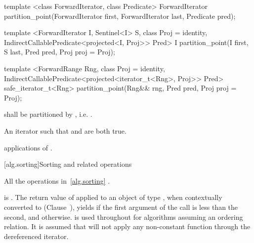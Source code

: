 %
\begin{removedblock}
\begin{itemdecl}
template <class ForwardIterator, class Predicate>
  ForwardIterator partition_point(ForwardIterator first,
                                  ForwardIterator last,
                                  Predicate pred);
\end{itemdecl}
\end{removedblock}
\begin{addedblock}
\begin{itemdecl}
template <ForwardIterator I, Sentinel<I> S, class Proj = identity,
    IndirectCallablePredicate<projected<I, Proj>> Pred>
  I partition_point(I first, S last, Pred pred, Proj proj = Proj{});

template <ForwardRange Rng, class Proj = identity,
    IndirectCallablePredicate<projected<iterator_t<Rng>, Proj>> Pred>
  safe_iterator_t<Rng>
    partition_point(Rng&& rng, Pred pred, Proj proj = Proj{});
\end{itemdecl}
\end{addedblock}

\begin{itemdescr}
\pnum
\requires {} shall be partitioned by , i.e.
.

\pnum
\returns An iterator  such that  and
 are both true.

\pnum
\complexity {} applications of .
\end{itemdescr}


[alg.sorting]{Sorting and related operations}

\pnum
All the operations in~\ref{alg.sorting} .

\pnum
{}
is . The return value of  applied to
an object of type , when contextually converted to
 (Clause~),
yields  if the first argument of the call
is less than the second, and
otherwise.
is used throughout for algorithms assuming an ordering relation.
It is assumed that
will not apply any non-constant function through the dereferenced iterator.

